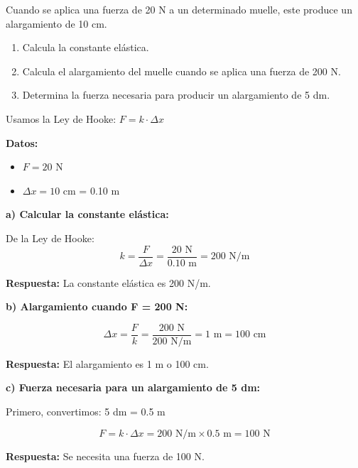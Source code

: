 \begin{exercise}
    Cuando se aplica una fuerza de 20 N a un determinado muelle, este produce un alargamiento de 10 cm.
    \begin{enumerate}[label=\alph*)]
        \item Calcula la constante elástica.
        \item Calcula el alargamiento del muelle cuando se aplica una fuerza de 200 N.
        \item Determina la fuerza necesaria para producir un alargamiento de 5 dm.
    \end{enumerate}

    \begin{solu}
        Usamos la Ley de Hooke: $F = k \cdot \Delta x$

        \textbf{Datos:}
        \begin{itemize}
            \item $F = 20$ N
            \item $\Delta x = 10$ cm = 0.10 m
        \end{itemize}

        \textbf{a) Calcular la constante elástica:}

        De la Ley de Hooke:
        $$k = \frac{F}{\Delta x} = \frac{20\text{ N}}{0.10\text{ m}} = 200\text{ N/m}$$

        \textbf{Respuesta:} La constante elástica es 200 N/m.

        \textbf{b) Alargamiento cuando F = 200 N:}

        $$\Delta x = \frac{F}{k} = \frac{200\text{ N}}{200\text{ N/m}} = 1\text{ m} = 100\text{ cm}$$

        \textbf{Respuesta:} El alargamiento es 1 m o 100 cm.

        \textbf{c) Fuerza necesaria para un alargamiento de 5 dm:}

        Primero, convertimos: 5 dm = 0.5 m

        $$F = k \cdot \Delta x = 200\text{ N/m} \times 0.5\text{ m} = 100\text{ N}$$

        \textbf{Respuesta:} Se necesita una fuerza de 100 N.
    \end{solu}
\end{exercise}


